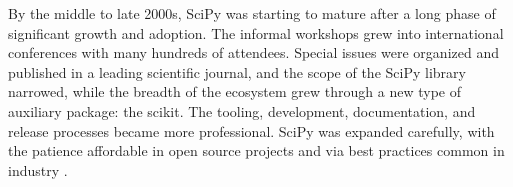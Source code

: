 \documentclass[fleqn,10pt]{wlscirep}
\begin{document}
%
%
%
%
%
%
%
%
%
%
%
%
%
%
%
%
%
%
%
%
%
%
%
%
%
%


By the middle to late 2000s, SciPy was starting to mature after a long phase of significant
growth and adoption.
The informal workshops grew into international conferences with many
hundreds of attendees. Special issues were organized and published in a
leading scientific journal\cite{dubois2007guest}, and the scope of the SciPy library
narrowed, while the breadth of the ecosystem grew
through a new type of auxiliary package: the scikit\cite{scikits-general}.
The tooling, development, documentation, and release processes became more professional.
SciPy was expanded carefully, with the patience affordable in open source
projects and via best practices common in industry \cite{millman2014developing}.
\end{document}
